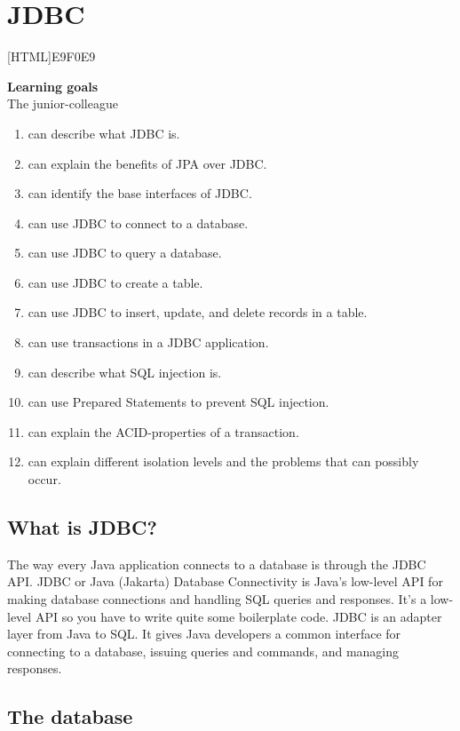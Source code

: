 \chapter{JDBC}
\label{chap:jdbc}

[HTML]{E9F0E9}{\parbox{\textwidth}{%
\noindent \textbf{Learning goals}\\
The junior-colleague
\begin{enumerate}[nolistsep]
\item can describe what JDBC is.
\item can explain the benefits of JPA over JDBC.
\item can identify the base interfaces of JDBC.
\item can use JDBC to connect to a database.
\item can use JDBC to query a database.
\item can use JDBC to create a table.
\item can use JDBC to insert, update, and delete records in a table.
\item can use transactions in a JDBC application.
\item can describe what SQL injection is.
\item can use Prepared Statements to prevent SQL injection.
\item can explain the ACID-properties of a transaction.
\item can explain different isolation levels and the problems that can possibly occur.
\end{enumerate}}}

\section{What is JDBC?}

The way every Java application connects to a database is through the JDBC API.
JDBC or Java (Jakarta) Database Connectivity is Java's low-level API for making database connections and handling SQL queries and responses. It's a low-level API so you have to write quite some boilerplate code.
JDBC is an adapter layer from Java to SQL. It gives Java developers a common interface for connecting to a database, issuing queries and commands, and managing responses.


\section{The database}

